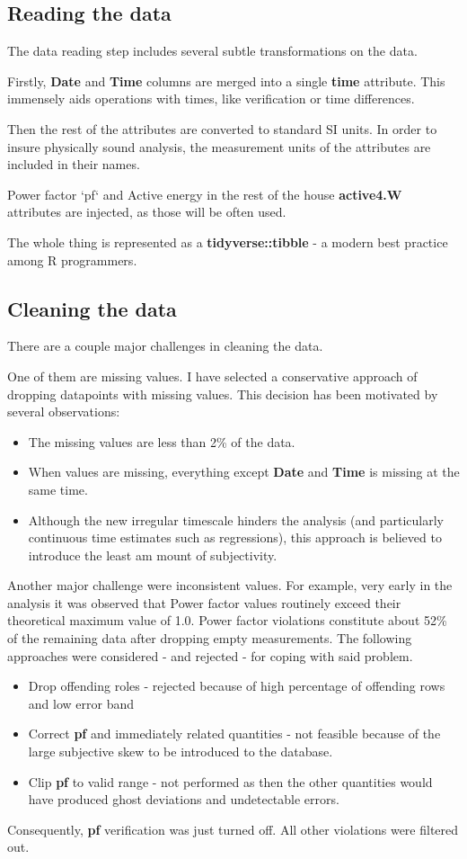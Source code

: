 \documentclass[11pt]{article}
\newcommand{\code}[1]{\textbf{#1}}
\newcommand{\para}[0]{\par\vspace{0.5cm}}
\begin{document}
\subsection{Reading the data}
The data reading step includes several subtle transformations on the data.
\para
Firstly, \code{Date} and \code{Time} columns are merged into a single \code{time} attribute.
This immensely aids operations with times, like verification or time differences.
\para
Then the rest of the attributes are converted to standard SI units.
In order to insure physically sound analysis, the measurement units of the attributes are included in their names.
\para
Power factor `pf` and Active energy in the rest of the house \code{active4.W} attributes are injected, as those will be often used.
\para
The whole thing is represented as a \code{tidyverse::tibble} - a modern best practice among R programmers. 

\subsection{Cleaning the data}
There are a couple major challenges in cleaning the data.
\para
One of them are missing values.
I have selected a conservative approach of dropping datapoints with missing values.
This decision has been motivated by several observations:
\begin{itemize}
    \item{The missing values are less than 2\% of the data.}
    \item{When values are missing, everything except \code{Date} and \code{Time} is missing at the same time.}
    \item{Although the new irregular timescale hinders the analysis (and particularly continuous time estimates such as regressions), this approach is believed to introduce the least am mount of subjectivity.}
\end{itemize}
\para
Another major challenge were inconsistent values.
For example, very early in the analysis it was observed that Power factor values routinely exceed their theoretical maximum value of 1.0.
Power factor violations constitute about 52\% of the remaining data after dropping empty measurements.
The following approaches were considered - and rejected - for coping with said problem.
\begin{itemize}
    \item{Drop offending roles - rejected because of high percentage of offending rows and low error band}
    \item{Correct \code{pf} and immediately related quantities - not feasible because of the large subjective skew to be introduced to the database.}
    \item{Clip \code{pf} to valid range - not performed as then the other quantities would have produced ghost deviations and undetectable errors.}
\end{itemize}
Consequently, \code{pf} verification was just turned off.
All other violations were filtered out.
\end{document}
